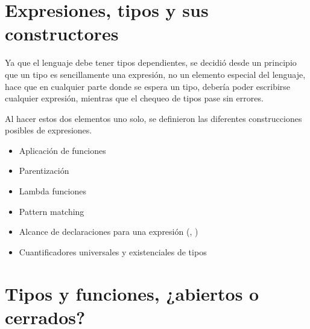 \section{Expresiones, tipos y sus constructores}

\begin{designfr}
Ya que el lenguaje debe tener tipos dependientes, se decidió desde un principio que un tipo es sencillamente una expresión, no un elemento especial del lenguaje, hace que en cualquier parte donde se espera un tipo, debería poder escribirse cualquier expresión, mientras que el chequeo de tipos pase sin errores.

Al hacer estos dos elementos uno solo, se definieron las diferentes construcciones posibles de expresiones.

\begin{itemize}
    \item Aplicación de funciones
    \item Parentización
    \item Lambda funciones
    \item Pattern matching
    \item Alcance de declaraciones para una expresión (, )
    \item Cuantificadores universales y existenciales de tipos
\end{itemize}
\end{designfr}

\section{Tipos y funciones, ¿abiertos o cerrados?}

